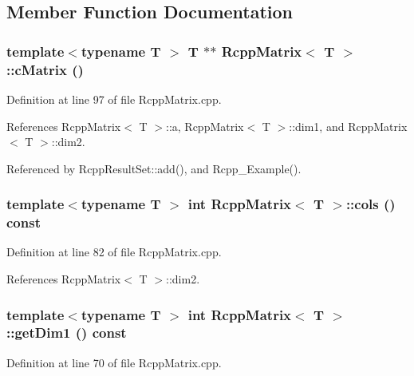 \subsection{Member Function Documentation}
\hypertarget{classRcppMatrix_ae94a95b2125bd594965e26a93c994da4}{
\subsubsection[{cMatrix}]{\setlength{\rightskip}{0pt plus 5cm}template$<$typename T $>$ T $\ast$$\ast$ {\bf RcppMatrix}$<$ T $>$::cMatrix ()}}
\label{classRcppMatrix_ae94a95b2125bd594965e26a93c994da4}


Definition at line 97 of file RcppMatrix.cpp.

References RcppMatrix$<$ T $>$::a, RcppMatrix$<$ T $>$::dim1, and RcppMatrix$<$ T $>$::dim2.

Referenced by RcppResultSet::add(), and Rcpp\_\-Example().\hypertarget{classRcppMatrix_a36dac30029a2e0414d42151cf6f60581}{
\subsubsection[{cols}]{\setlength{\rightskip}{0pt plus 5cm}template$<$typename T $>$ int {\bf RcppMatrix}$<$ T $>$::cols () const}}
\label{classRcppMatrix_a36dac30029a2e0414d42151cf6f60581}


Definition at line 82 of file RcppMatrix.cpp.

References RcppMatrix$<$ T $>$::dim2.\hypertarget{classRcppMatrix_af0ff9517b871e3c7aad237c57ef87498}{
\subsubsection[{getDim1}]{\setlength{\rightskip}{0pt plus 5cm}template$<$typename T $>$ int {\bf RcppMatrix}$<$ T $>$::getDim1 () const}}
\label{classRcppMatrix_af0ff9517b871e3c7aad237c57ef87498}


Definition at line 70 of file RcppMatrix.cpp.

